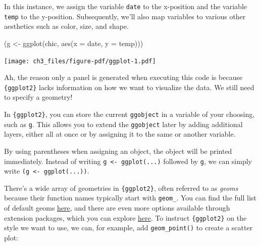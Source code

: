 \documentclass[
  letterpaper,
]{scrbook}
\newenvironment{Shaded}{\begin{snugshade}}{\end{snugshade}}
\newcommand{\AttributeTok}[1]{\textcolor[rgb]{0.40,0.45,0.13}{#1}}
\newcommand{\FunctionTok}[1]{\textcolor[rgb]{0.28,0.35,0.67}{#1}}
\newcommand{\NormalTok}[1]{\textcolor[rgb]{0.00,0.23,0.31}{#1}}
\newcommand{\OtherTok}[1]{\textcolor[rgb]{0.00,0.23,0.31}{#1}}
\begin{document}
In this instance, we assign the variable \texttt{date} to the x-position
and the variable \texttt{temp} to the y-position. Subsequently, we'll
also map variables to various other aesthetics such as color, size, and
shape.

\begin{Shaded}
\begin{Highlighting}[]
\NormalTok{(g }\OtherTok{\textless{}{-}} \FunctionTok{ggplot}\NormalTok{(chic, }\FunctionTok{aes}\NormalTok{(}\AttributeTok{x =}\NormalTok{ date, }\AttributeTok{y =}\NormalTok{ temp)))}
\end{Highlighting}
\end{Shaded}

\texttt{[image: ch3\_files/figure-pdf/ggplot-1.pdf]}

Ah, the reason only a panel is generated when executing this code is
because \texttt{\{ggplot2\}} lacks information on how we want to
visualize the data. We still need to specify a geometry!

In \texttt{\{ggplot2\}}, you can store the current \texttt{ggobject} in
a variable of your choosing, such as \texttt{g}. This allows you to
extend the \texttt{ggobject} later by adding additional layers, either
all at once or by assigning it to the same or another variable.

\begin{tcolorbox}[enhanced jigsaw, rightrule=.15mm, arc=.35mm, title=\textcolor{quarto-callout-tip-color}{\faLightbulb}\hspace{0.5em}{A Quick Tip!}, colback=white, toptitle=1mm, colbacktitle=quarto-callout-tip-color!10!white, breakable, left=2mm, opacityback=0, leftrule=.75mm, bottomrule=.15mm, bottomtitle=1mm, colframe=quarto-callout-tip-color-frame, coltitle=black, toprule=.15mm, opacitybacktitle=0.6, titlerule=0mm]

By using parentheses when assigning an object, the object will be
printed immediately. Instead of writing
\texttt{g\ \textless{}-\ ggplot(...)} followed by \texttt{g}, we can
simply write \texttt{(g\ \textless{}-\ ggplot(...))}.

\end{tcolorbox}

There's a wide array of geometries in \texttt{\{ggplot2\}}, often
referred to as \emph{geoms} because their function names typically start
with \texttt{geom\_}. You can find the full list of default geoms
\href{https://ggplot2.tidyverse.org/reference/}{here}, and there are
even more options available through extension packages, which you can
explore \href{https://exts.ggplot2.tidyverse.org/}{here}. To instruct
\texttt{\{ggplot2\}} on the style we want to use, we can, for example,
add \texttt{geom\_point()} to create a scatter plot:
\end{document}
